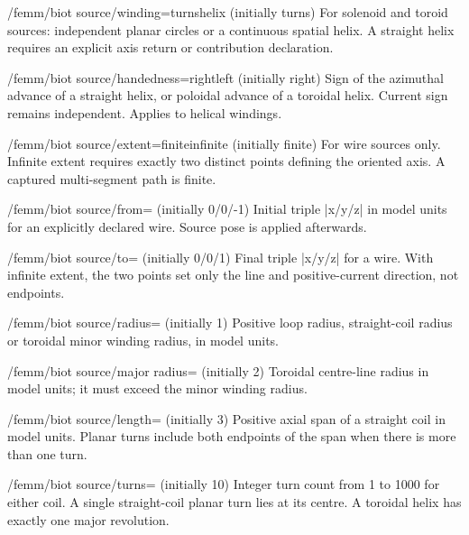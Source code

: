 \begin{key}{/femm/biot source/winding=turns\textbar helix (initially turns)}
For solenoid and toroid sources: independent planar circles or a continuous spatial helix. A straight helix requires an explicit axis return or contribution declaration.
\end{key}
\begin{key}{/femm/biot source/handedness=right\textbar left (initially right)}
Sign of the azimuthal advance of a straight helix, or poloidal advance of a toroidal helix. Current sign remains independent. Applies to helical windings.
\end{key}
\begin{key}{/femm/biot source/extent=finite\textbar infinite (initially finite)}
For wire sources only. Infinite extent requires exactly two distinct points defining the oriented axis. A captured multi-segment path is finite.
\end{key}
\begin{key}{/femm/biot source/from= (initially 0/0/-1)}
Initial triple |x/y/z| in model units for an explicitly declared wire. Source pose is applied afterwards.
\end{key}
\begin{key}{/femm/biot source/to= (initially 0/0/1)}
Final triple |x/y/z| for a wire. With infinite extent, the two points set only the line and positive-current direction, not endpoints.
\end{key}
\begin{key}{/femm/biot source/radius= (initially 1)}
Positive loop radius, straight-coil radius or toroidal minor winding radius, in model units.
\end{key}
\begin{key}{/femm/biot source/major radius= (initially 2)}
Toroidal centre-line radius in model units; it must exceed the minor winding radius.
\end{key}
\begin{key}{/femm/biot source/length= (initially 3)}
Positive axial span of a straight coil in model units. Planar turns include both endpoints of the span when there is more than one turn.
\end{key}
\begin{key}{/femm/biot source/turns= (initially 10)}
Integer turn count from 1 to 1000 for either coil. A single straight-coil planar turn lies at its centre. A toroidal helix has exactly one major revolution.
\end{key}
